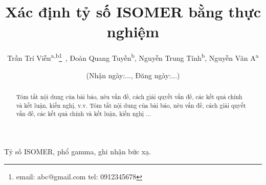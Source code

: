 \documentclass[11pt, a4paper, journal]{paper}
\def\submit{\small (Nhận ngày:..., Đăng ngày:...)}
\begin{document}
\title{Xác định tỷ số ISOMER bằng thực nghiệm}

\author{Trần Trí Viễn\textsuperscript{a,b}\thanks{email: abc@gmail.com \newline tel: 0912345678}~, 
	Đoàn Quang Tuyền\textsuperscript{b}, 
	Nguyễn Trung Tính\textsuperscript{b}, 
	Nguyễn Văn A\textsuperscript{a}
}

\date{\submit}


\maketitle

\begin{abstract}
Tóm tắt nội dung của bài báo, nêu vấn đề, cách giải quyết vấn đề, các kết quả chính và kết luận, kiến nghị, v.v. Tóm tắt nội dung của bài báo, nêu vấn đề, cách giải quyết vấn đề, các kết quả chính và kết luận, kiến nghị ... 
\end{abstract}

\begin{keywords}
Tỷ số ISOMER, phổ gamma, ghi nhận bức xạ.
\end{keywords}
\end{document}
